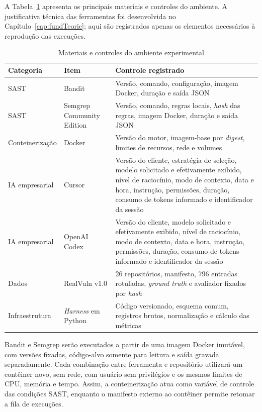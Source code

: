 A Tabela~\ref{tab:ambiente-experimental} apresenta os principais materiais e controles do ambiente. A justificativa técnica das ferramentas foi desenvolvida no Capítulo~\ref{cap:fundTeoric}; aqui são registrados apenas os elementos necessários à reprodução das execuções.

\begin{table}[htb]
\ABNTEXfontereduzida
\caption{\label{tab:ambiente-experimental}Materiais e controles do ambiente experimental}
\centering
\begin{tabularx}{\textwidth}{|l|X|X|}
\hline
\textbf{Categoria} & \textbf{Item} & \textbf{Controle registrado} \\
\hline
SAST & Bandit & Versão, comando, configuração, imagem Docker, duração e saída JSON \\
\hline
SAST & Semgrep Community Edition & Versão, comando, regras locais, \textit{hash} das regras, imagem Docker, duração e saída JSON \\
\hline
Conteinerização & Docker & Versão do motor, imagem-base por \textit{digest}, limites de recursos, rede e volumes \\
\hline
IA empresarial & Cursor & Versão do cliente, estratégia de seleção, modelo solicitado e efetivamente exibido, nível de raciocínio, modo de contexto, data e hora, instrução, permissões, duração, consumo de tokens informado e identificador da sessão \\
\hline
IA empresarial & OpenAI Codex & Versão do cliente, modelo solicitado e efetivamente exibido, nível de raciocínio, modo de contexto, data e hora, instrução, permissões, duração, consumo de tokens informado e identificador da sessão \\
\hline
Dados & RealVuln v1.0 & 26 repositórios, manifesto, 796 entradas rotuladas, \textit{ground truth} e avaliador fixados por \textit{hash} \\
\hline
Infraestrutura & \textit{Harness} em Python & Código versionado, esquema comum, registros brutos, normalização e cálculo das métricas \\
\hline
\end{tabularx}
\end{table}

Bandit e Semgrep serão executados a partir de uma imagem Docker imutável, com versões fixadas, código-alvo somente para leitura e saída gravada separadamente. Cada combinação entre ferramenta e repositório utilizará um contêiner novo, sem rede, com usuário sem privilégios e os mesmos limites de CPU, memória e tempo. Assim, a conteinerização atua como variável de controle das condições SAST, enquanto o manifesto externo ao contêiner permite retomar a fila de execuções.


